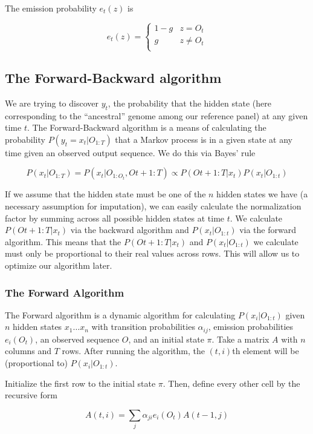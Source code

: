 \documentclass[12pt]{article}
\begin{document}
The emission probability $e_t(z)$ is

\[ e_t(z) = \begin{cases} 
      1-g & z = O_t \\
      g & z \neq O_t \\
   \end{cases}
\]

\subsection{The Forward-Backward algorithm}

We are trying to discover $y_t$, the probability that the hidden state (here corresponding to the ``ancestral'' genome among our reference panel) at any given time $t$.  The Forward-Backward algorithm is a means of calculating the probability $P(y_t = x_t | O_{1:T})$ that a Markov process is in a given state at any time given an observed output sequence.  We do this via Bayes' rule

$$ P(x_t | O_{1:T}) = P(x_t | O_{1:O_t}, O{t+1:T}) \propto P(O{t+1:T} | x_t) P(x_t | O_{1:t}) $$

If we assume that the hidden state must be one of the $n$ hidden states we have (a necessary assumption for imputation), we can easily calculate the normalization factor by summing across all possible hidden states at time $t$.  We calculate $P(O{t+1:T} | x_t)$ via the backward algorithm and $P(x_t | O_{1:t})$ via the forward algorithm.  This means that the $P(O{t+1:T} | x_t)$ and $P(x_t | O_{1:t})$ we calculate must only be proportional to their real values across rows.  This will allow us to optimize our algorithm later.

\subsubsection{The Forward Algorithm}

The Forward algorithm is a dynamic algorithm for calculating $P(x_i | O_{1:t})$ given $n$ hidden states $x_1 \ldots x_n$ with transition probabilities $\alpha_{ij}$, emission probabilities $e_i(O_t)$, an observed sequence $O$, and an initial state $\pi$.  Take a matrix $A$ with $n$ columns and $T$ rows.  After running the algorithm, the $(t,i)$th element will be (proportional to) $P(x_i | O_{1:t})$.  

Initialize the first row to the initial state $\pi$.  Then, define every other cell by the recursive form

$$ A(t, i) = \sum_j \alpha_{ji} e_i(O_t) A(t-1, j) $$
\end{document}
